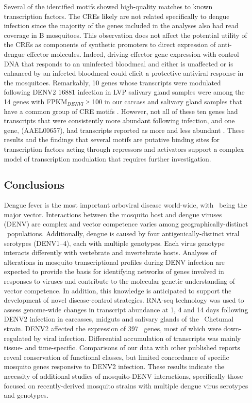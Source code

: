 Several of the identified motifs showed high-quality matches to known transcription factors.
The \glspl{CRE} likely are not related specifically to dengue infection since the majority of the genes included in the analyses also had read coverage in B mosquitoes.
This observation does not affect the potential utility of the \glspl{CRE} as components of synthetic promoters to direct expression of anti-dengue effector molecules.
Indeed, driving effector gene expression with control DNA that responds to an uninfected bloodmeal and either is unaffected or is enhanced by an infected bloodmeal could elicit a protective antiviral response in the mosquitoes.
Remarkably, 10 genes whose transcripts were modulated following \gls{DENV}2 16881 infection in \gls{LVP} salivary gland samples were among the 14 genes with FPKM$_{DENVI}$ ≥ 100 in our carcass and salivary gland samples that have a common group of \gls{CRE} motifs \cite{Luplertlop2011}.
However, not all of these ten genes had transcripts that were consistently more abundant following infection, and one gene, (AAEL00657), had transcripts reported as more and less abundant \cite{Luplertlop2011}.
These results and the findings that several motifs are putative binding sites for transcription factors acting through repressors and activators support a complex model of transcription modulation that requires further investigation.

\subsection{Conclusions}

Dengue fever is the most important arboviral disease world-wide, with \Aea\ being the major vector.
Interactions between the mosquito host and dengue viruses (\gls{DENV}) are complex and vector competence varies among geographically-distinct \Aa\ populations.
Additionally, dengue is caused by four antigenically-distinct viral serotypes (\gls{DENV}1–4), each with multiple genotypes.
Each virus genotype interacts differently with vertebrate and invertebrate hosts.
Analyses of alterations in mosquito transcriptional profiles during \gls{DENV} infection are expected to provide the basis for identifying networks of genes involved in responses to viruses and contribute to the molecular-genetic understanding of vector competence.
In addition, this knowledge is anticipated to support the development of novel disease-control strategies.
RNA-seq technology was used to assess genome-wide changes in transcript abundance at 1, 4 and 14 days following \gls{DENV}2 infection in carcasses, midguts and salivary glands of the \Aa\ Chetumal strain.
\gls{DENV}2 affected the expression of 397 \Aa\ genes, most of which were down-regulated by viral infection.
Differential accumulation of transcripts was mainly tissue- and time-specific.
Comparisons of our data with other published reports reveal conservation of functional classes, but limited concordance of specific mosquito genes responsive to \gls{DENV}2 infection.
These results indicate the necessity of additional studies of mosquito-\gls{DENV} interactions, specifically those focused on recently-derived mosquito strains with multiple dengue virus serotypes and genotypes.


